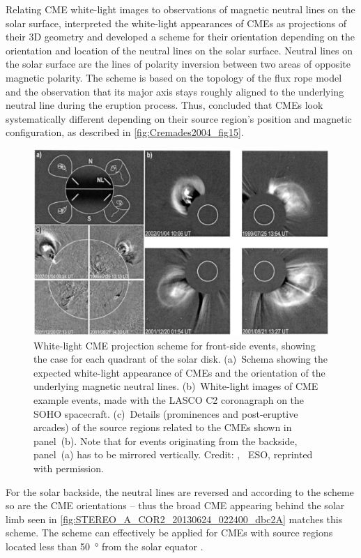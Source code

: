 Relating CME white-light images to observations of magnetic neutral lines on the solar surface, \citet{Cremades2004} interpreted the white-light appearances of CMEs as projections of their 3D geometry and developed a scheme for their orientation depending on the orientation and location of the neutral lines on the solar surface. Neutral lines on the solar surface are the lines of polarity inversion between two areas of opposite magnetic polarity. The scheme is based on the topology of the flux rope model and the observation that its major axis stays roughly aligned to the underlying neutral line during the eruption process. Thus, \citet{Cremades2004} concluded that CMEs look systematically different depending on their source region's position and magnetic configuration, as described in \autoref{fig:Cremades2004_fig15}.
\begin{figure}[htb]
	\centering
	\includegraphics[width=\textwidth]{figures_of_others/images/Cremades2004_fig15.png}
	\caption[Credit: {\citet[Fig.~15]{Cremades2004}}, \textcopyright~ESO, reprinted with permission.]
	{White-light CME projection scheme for front-side events, showing the case for each quadrant of the solar disk. (a)~Schema showing the expected white-light appearance of CMEs and the orientation of the underlying magnetic neutral lines. (b)~White-light images of CME example events, made with the LASCO C2 coronagraph on the SOHO spacecraft. (c)~Details (prominences and post-eruptive arcades) of the source regions related to the CMEs shown in panel~(b). Note that for events originating from the backside, panel~(a) has to be mirrored vertically. Credit: {\citet[Fig.~15]{Cremades2004}}, \textcopyright~ESO, reprinted with permission.}
	\label{fig:Cremades2004_fig15}
\end{figure}
For the solar backside, the neutral lines are reversed and according to the scheme so are the CME orientations -- thus the broad CME appearing behind the solar limb seen in \autoref{fig:STEREO_A_COR2_20130624_022400_dbc2A} matches this scheme. The scheme can effectively be applied for CMEs with source regions located less than \SI{50}{\degree} from the solar equator \citep{Webb2012}.

